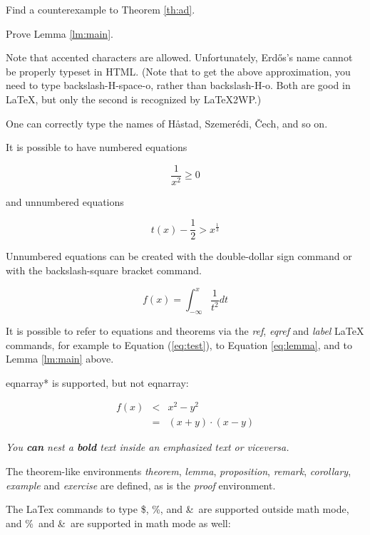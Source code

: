 \begin{exercise} Find a counterexample to Theorem \ref{th:ad}.
\end{exercise}

\begin{exercise}[Advanced] Prove Lemma \ref{lm:main}. \end{exercise}

Note that accented characters are allowed. Unfortunately,
Erd\H os's name cannot be properly typeset in HTML.
(Note that to get the above approximation, you need to type
backslash-H-space-o, rather than backslash-H-{o}. Both are
good in LaTeX, but only the second is recognized by LaTeX2WP.)

One can correctly type the names of H\aa stad, Szemer\'edi,
\v{C}ech, and so on.

It is possible to have numbered equations

\begin{equation} \label{eq:test} \frac 1 {x^2} \ge 0 \end{equation}

and unnumbered equations

$$ t(x) - \frac 12 > x^{\frac 13} $$

Unnumbered equations can be created with the double-dollar sign 
command or with the backslash-square bracket command.

\[ f(x) = \int_{-\infty}^{x} \frac 1 {t^2} dt \]

It is possible to refer to equations and
theorems via the {\em ref}, {\em eqref} and {\em label} LaTeX
commands, for example to Equation (\ref{eq:test}),
to Equation \eqref{eq:lemma},
and to Lemma \ref{lm:main} above.

eqnarray* is supported, but not eqnarray:


\begin{eqnarray*}
f(x) & <  & x^2 - y^2\\
& = & (x+y) \cdot (x-y)
\end{eqnarray*}

{\em You {\bf can} nest a {\bf bold} text inside an emphasized
text or viceversa.}



The theorem-like environments {\em theorem}, {\em lemma},
{\em proposition}, {\em remark}, {\em corollary}, {\em example}
and {\em exercise} are defined, as is the {\em proof} environment.

The LaTex commands to type \$, \%, and \&\ are supported outside
math mode, and \%\ and \&\ are supported in math mode as well:

